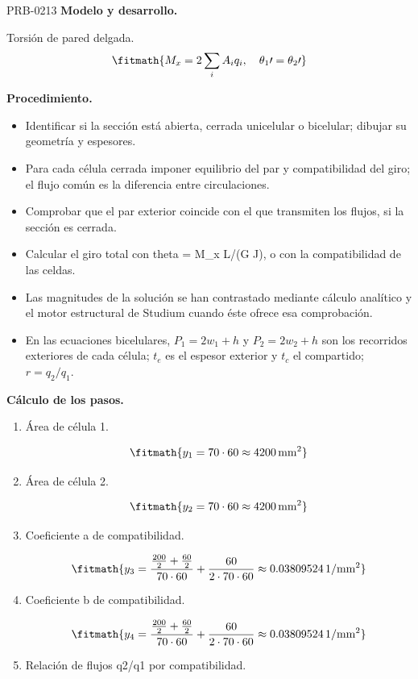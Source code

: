 \begin{studiumworked}{PRB-0213}
\textbf{Modelo y desarrollo.}

Torsión de pared delgada.\[\fitmath{M_x=2\sum_i A_iq_i,\quad \theta_1\prime=\theta_2\prime}\]

\textbf{Procedimiento.}\begin{itemize}\item Identificar si la sección está abierta, cerrada unicelular o bicelular; dibujar su geometría y espesores.
\item Para cada célula cerrada imponer equilibrio del par y compatibilidad del giro; el flujo común es la diferencia entre circulaciones.
\item Comprobar que el par exterior coincide con el que transmiten los flujos, si la sección es cerrada.
\item Calcular el giro total con theta = M\_x L/(G J), o con la compatibilidad de las celdas.
\item Las magnitudes de la solución se han contrastado mediante cálculo analítico y el motor estructural de Studium cuando éste ofrece esa comprobación.
\item En las ecuaciones bicelulares, $P_1=2w_1+h$ y $P_2=2w_2+h$ son los recorridos exteriores de cada célula; $t_e$ es el espesor exterior y $t_c$ el compartido; $r=q_2/q_1$.\end{itemize}

\textbf{Cálculo de los pasos.}

\begin{enumerate}

\item Área de célula 1.

\[\fitmath{y_{1}=70\cdot 60\approx 4200\,\mathrm{mm^{2}}}\]

\item Área de célula 2.

\[\fitmath{y_{2}=70\cdot 60\approx 4200\,\mathrm{mm^{2}}}\]

\item Coeficiente a de compatibilidad.

\[\fitmath{y_{3}=\frac{\frac{200}{2}+\frac{60}{2}}{70\cdot 60}+\frac{60}{2\cdot 70\cdot 60}\approx 0.03809524\,\mathrm{1/mm^{2}}}\]

\item Coeficiente b de compatibilidad.

\[\fitmath{y_{4}=\frac{\frac{200}{2}+\frac{60}{2}}{70\cdot 60}+\frac{60}{2\cdot 70\cdot 60}\approx 0.03809524\,\mathrm{1/mm^{2}}}\]

\item Relación de flujos q2/q1 por compatibilidad.


\end{enumerate}
\end{studiumworked}
